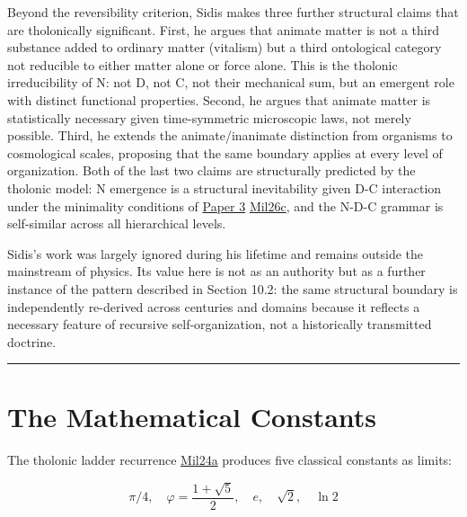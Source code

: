 \documentclass[12pt]{article}
\begin{document}
Beyond the reversibility criterion, Sidis makes three further structural
claims that are tholonically significant. First, he argues that animate
matter is not a third substance added to ordinary matter (vitalism) but
a third ontological category not reducible to either matter alone or
force alone. This is the tholonic irreducibility of N: not D, not C, not
their mechanical sum, but an emergent role with distinct functional
properties. Second, he argues that animate matter is statistically
necessary given time-symmetric microscopic laws, not merely possible.
Third, he extends the animate/inanimate distinction from organisms to
cosmological scales, proposing that the same boundary applies at every
level of organization. Both of the last two claims are structurally
predicted by the tholonic model: N emergence is a structural
inevitability given D-C interaction under the minimality conditions of
\href{https://github.com/baardev/truevalue/blob/main/docnav/Research/papers/3_minimal-recursive-triadic-framework/3_minimal-recursive-triadic-framework.pdf}{Paper
3}
\href{https://github.com/baardev/truevalue/blob/main/docnav/Research/papers/3_minimal-recursive-triadic-framework/3_minimal-recursive-triadic-framework.pdf}{Mil26c},
and the N-D-C grammar is self-similar across all hierarchical levels.

Sidis's work was largely ignored during his lifetime and remains outside
the mainstream of physics. Its value here is not as an authority but as
a further instance of the pattern described in Section 10.2: the same
structural boundary is independently re-derived across centuries and
domains because it reflects a necessary feature of recursive
self-organization, not a historically transmitted doctrine.

\begin{center}\rule{0.5\linewidth}{0.5pt}\end{center}

\section{The Mathematical Constants}\label{the-mathematical-constants}

The tholonic ladder recurrence
\href{https://github.com/baardev/truevalue/blob/main/docnav/Research/papers/1_recursive-tholonic-five-constants/1_recursive-tholonic-five-constants.pdf}{Mil24a}
produces five classical constants as limits:

\[\pi/4, \quad \varphi = \frac{1 + \sqrt{5}}{2}, \quad e, \quad \sqrt{2}, \quad \ln 2\]
\end{document}
